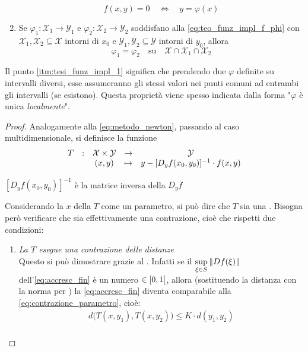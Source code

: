 \begin{theorem}
\begin{enumerate}
			\begin{equation}
				\label{eq:teo_funz_impl_f_phi}
				f(x,y) = 0 \quad \iff \quad y = \varphi(x)
			\end{equation}
		\item \label{itm:tesi_funz_impl_1} Se $\varphi_1: \mathcal{X}_1 \to \mathcal{Y}_1$ e $\varphi_2: \mathcal{X}_2 \to \mathcal{Y}_2$ soddisfano alla \cref{eq:teo_funz_impl_f_phi} con $\mathcal{X}_1, \mathcal{X}_2 \subseteq \mathcal{X}$ intorni di $x_0$ e $\mathcal{Y}_1, \mathcal{Y}_2 \subseteq \mathcal{Y}$ intorni di $y_0$, allora
			\[\varphi_1 = \varphi_2 \quad \text{su} \quad \mathcal{X} \cap \mathcal{X}_1 \cap \mathcal{X}_2\]
	\end{enumerate}
	\begin{note}
		Il punto \ref{itm:tesi_funz_impl_1} significa che prendendo due $\varphi$ definite su intervalli diversi, esse assumeranno gli stessi valori nei punti comuni ad entrambi gli intervalli (se esistono). Questa proprietà viene spesso indicata dalla forma "$\varphi$ è unica \textit{localmente}".
	\end{note}
	\begin{proof}
		Analogamente alla \cref{eq:metodo_newton}, passando al caso multidimensionale, si definisce la funzione
		\begin{equation}
			\label{eq:funz_impl_T}
			\begin{array}{ccccc} {T} & : & {\mathcal{X} \times \mathcal{Y}} & \to & {\mathcal{Y}} \\ & & {(x,y)} & \mapsto & {y - [D_yf(x_0, y_0)]^{-1} \cdot f(x, y)} \\ \end{array}
		\end{equation}
		\begin{note}
			$[D_yf(x_0, y_0)]^{-1}$ è la matrice inversa della $D_yf$
		\end{note}
		Considerando la $x$ della $T$ come un parametro, si può dire che $T$ sia una . Bisogna però verificare che sia effettivamente una contrazione, cioè che rispetti due condizioni:
		\begin{enumerate}
			\item \textit{La $T$ esegue una contrazione delle distanze}\\
				Questo si può dimostrare grazie al . Infatti se il $\sup\limits_{\xi \in S} \left\|Df(\xi)\right\|$ dell'\cref{eq:accresc_fin} è un numero $\in \left[0,1\right[$, allora (sostituendo la distanza con la norma per ) la \cref{eq:accresc_fin} diventa comparabile alla \cref{eq:contrazione_parametro}, cioè:
				\[
					\begin{gathered}
						d \bigl( T(x, y_1), T(x, y_2) \bigr) \leq K \cdot d(y_1, y_2)\\

\end{gathered}\]
\end{enumerate}
\end{proof}
\end{theorem}
